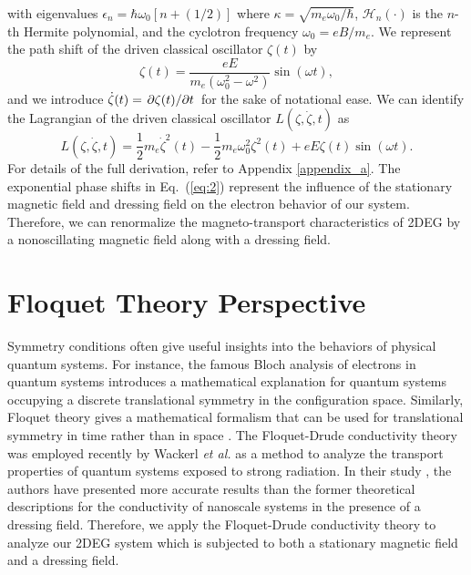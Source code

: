 \documentclass[
 reprint,
 amsmath,amssymb,
 aps,
 prb,
]{revtex4-2}
\begin{document}
with eigenvalues $\epsilon_n = \hbar \omega_0 [n + (1/2)]$ where $\kappa = \sqrt{{m_e \omega_0}/{\hbar}}$, $\mathcal{H}_n(\cdot)$ is the $n$-th Hermite polynomial, and the cyclotron frequency $\omega_0 = eB/m_e$.
We represent the path shift of the driven classical oscillator $\zeta(t)$ by
\begin{equation} \label{eq:4}
  \zeta(t) = \frac{eE}{m_e(\omega_0^2 - \omega^2)}\sin(\omega t),
\end{equation}
and we introduce $\dot{\zeta}(t) = \pdv*{\zeta(t)}{t}$ for the sake of notational ease. We can identify the Lagrangian of the driven classical oscillator $L(\zeta,\dot{\zeta},t)$ as
\begin{equation} \label{eq:5}
  L(\zeta,\dot{\zeta},t) = \frac{1}{2} m_e\dot{\zeta}^2(t) - \frac{1}{2}m_e\omega_0^2 \zeta^2(t) + eE\zeta(t) \sin(\omega t).
\end{equation}
For details of the full derivation, refer to Appendix \ref{appendix_a}.
The exponential phase shifts in Eq.~(\ref{eq:2}) represent the influence of the stationary magnetic field and dressing field on the electron behavior of our system. Therefore, we can renormalize the magneto-transport characteristics of 2DEG by a nonoscillating magnetic field along with a dressing field.

\section{\label{sec:floquet_theory} Floquet Theory Perspective}

Symmetry conditions often give useful insights into the behaviors of physical quantum systems.
For instance, the famous Bloch analysis of electrons in quantum systems introduces a mathematical explanation for quantum systems occupying a discrete translational symmetry in the configuration space. Similarly, Floquet theory gives a mathematical formalism that can be used for translational symmetry in time rather than in space \cite{floquet83,grifoni98,holthaus15}.
The Floquet-Drude conductivity theory was employed recently by Wackerl \textit{et al.} \cite{wackerl20} as a method to analyze the transport properties of quantum systems exposed to strong radiation.
{\color{Red}In their study \cite{wackerl20}, the authors have presented more accurate results than the former theoretical descriptions \cite{morina15,pervishko15} for the conductivity of nanoscale systems in the  presence of a dressing field.} Therefore, we apply the Floquet-Drude conductivity theory to analyze our 2DEG system which is subjected to both a stationary magnetic field and a dressing field.
\end{document}
